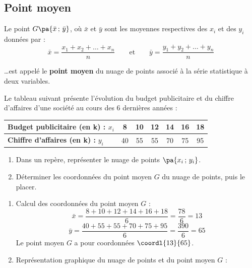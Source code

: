 \subsection{Point moyen}
\begin{defin}
	Le point $G\pa{\bar{x}\,;\,\bar{y}}$, où $\bar{x}$ et $\bar{y}$ sont les moyennes respectives des $x_{i}$ et des $y_{i}$ données par :
	\[
		\bar{x} = \dfrac{x_1 + x_2 + \dots + x_n}{n} \qquad\text{et}\qquad \bar{y} = \dfrac{y_1 + y_2 + \dots + y_n}{n}
	\]

	\ldots est appelé le \textbf{point moyen} du nuage de points associé à la série statistique à deux variables.
\end{defin}

\begin{methode}
	Le tableau suivant présente l'évolution du budget publicitaire et du chiffre d'affaires d'une société au cours des 6 dernières années :

	\begin{center}
		\begin{tabular}{|l|c|c|c|c|c|c|}
			\hline
			\ccg \textbf{Budget publicitaire (en k\eur{}) :} $x_i$ & 8  & 10 & 12 & 14 & 16 & 18 \\ \hline
			\ccg \textbf{Chiffre d'affaires (en k\eur{}) :} $y_i$  & 40 & 55 & 55 & 70 & 75 & 95 \\ \hline
		\end{tabular}
	\end{center}

	\begin{enumerate}
		\item Dans un repère, représenter le nuage de points $\pa{x_{i}\,;\,y_{i}}$.
		\item Déterminer les coordonnées du point moyen $G$ du nuage de points, puis le placer.
	\end{enumerate}

	\begin{correction}
		\nline
		\begin{enumerate}
			\item Calcul des coordonnées du point moyen $G$ :
			      \[
				      \bar{x} = \dfrac{8+10+12+14+16+18}{6} = \dfrac{78}{6} = 13
			      \]
			      \[
				      \bar{y} = \dfrac{40+55+55+70+75+95}{6} = \dfrac{390}{6} = 65
			      \]
			      Le point moyen $G$ a pour coordonnées $\coordl{13}{65}$.

			\item Représentation graphique du nuage de points et du point moyen $G$ :


\end{enumerate}
\end{correction}
\end{methode}
